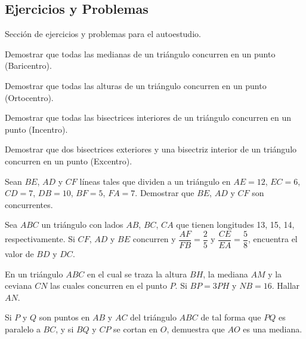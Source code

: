 \subsection{Ejercicios y Problemas}
Sección de ejercicios y problemas para el autoestudio.

\begin{section-exercise}
    Demostrar que todas las medianas de un triángulo concurren en un punto (Baricentro).
\end{section-exercise}

\begin{section-exercise}
    Demostrar que todas las alturas de un triángulo concurren en un punto (Ortocentro).
\end{section-exercise}

\begin{section-exercise}
    Demostrar que todas las bisectrices interiores de un triángulo concurren en un punto (Incentro).
\end{section-exercise}

\begin{section-exercise}
    Demostrar que dos bisectrices exteriores y una bisectriz interior de un triángulo concurren en un punto (Excentro).
\end{section-exercise}

\begin{section-exercise}
    Sean $BE$, $AD$ y $CF$ líneas tales que dividen a un triángulo en $AE = 12$, $EC = 6$, $CD = 7$, $DB = 10$, $BF = 5$, $FA = 7$.
    Demostrar que $BE$, $AD$ y $CF$ son concurrentes.
\end{section-exercise}

\begin{section-exercise}
    Sea $ABC$ un triángulo con lados $AB$, $BC$, $CA$ que tienen longitudes 13, 15, 14, respectivamente.
    Si $CF$, $AD$ y $BE$ concurren y $\dfrac{AF}{FB} = \dfrac{2}{5}$ y $\dfrac{CE}{EA} = \dfrac{5}{8}$, encuentra el valor de $BD$ y $DC$.
\end{section-exercise}

\begin{section-exercise}
    En un triángulo $ABC$ en el cual se traza la altura $BH$, la mediana $AM$ y la ceviana $CN$ las cuales concurren en el punto $P$.
    Si $BP = 3PH$ y $NB = 16$.
    Hallar $AN$.
\end{section-exercise}

\begin{section-exercise}
    Si $P$ y $Q$ son puntos en $AB$ y $AC$ del triángulo $ABC$ de tal forma que $PQ$ es paralelo a $BC$, y si $BQ$ y $CP$ se cortan en $O$, demuestra que $AO$ es una mediana.
\end{section-exercise}

